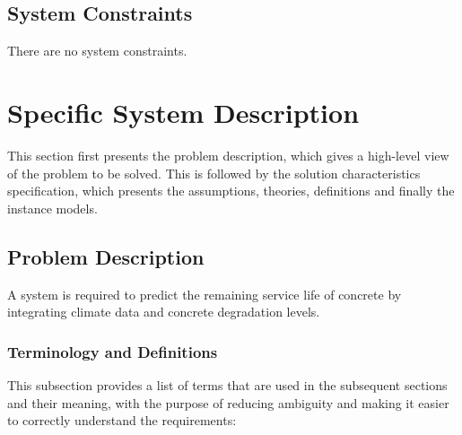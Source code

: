 \documentclass[12pt]{article}
\begin{document}
\subsection{System Constraints}

There are no system constraints.

\section{Specific System Description}

This section first presents the problem description, which gives a high-level view of the problem to be solved.  This is followed by the solution characteristics specification, which presents the assumptions, theories, definitions and finally
the instance models. 

\subsection{Problem Description} \label{Sec_pd}

A system is required to predict the remaining service life of concrete by integrating climate data and concrete degradation levels.

\subsubsection{Terminology and  Definitions}

This subsection provides a list of terms that are used in the subsequent sections and their meaning, with the purpose of reducing ambiguity and making it easier to correctly understand the requirements:
\end{document}

